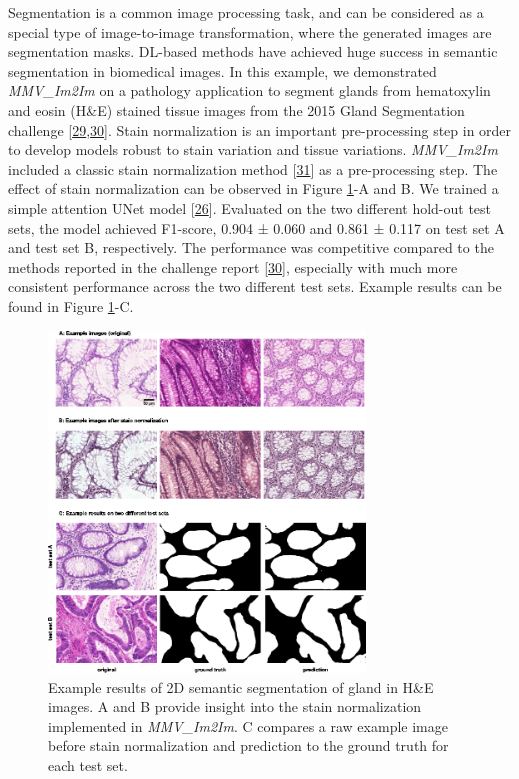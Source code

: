 Segmentation is a common image processing task, and can be considered as a special type of image-to-image transformation, where the generated images are segmentation masks. DL-based methods have achieved huge success in semantic segmentation in biomedical images. In this example, we demonstrated \emph{MMV\_Im2Im} on a pathology application to segment glands from hematoxylin and eosin (H\&E) stained tissue images from the 2015 Gland Segmentation challenge {[}\protect\hyperlink{ref-45Sirz1X}{29},\protect\hyperlink{ref-XAffSYIR}{30}{]}. Stain normalization is an important pre-processing step in order to develop models robust to stain variation and tissue variations. \emph{MMV\_Im2Im} included a classic stain normalization method {[}\protect\hyperlink{ref-tQhnZyjK}{31}{]} as a pre-processing step. The effect of stain normalization can be observed in Figure \ref{fig:2d_gland}-A and B. We trained a simple attention UNet model {[}\protect\hyperlink{ref-OCow1hly}{26}{]}. Evaluated on the two different hold-out test sets, the model achieved F1-score, 0.904 ± 0.060 and 0.861 ± 0.117 on test set A and test set B, respectively. The performance was competitive compared to the methods reported in the challenge report {[}\protect\hyperlink{ref-XAffSYIR}{30}{]}, especially with much more consistent performance across the two different test sets. Example results can be found in Figure \ref{fig:2d_gland}-C.

\begin{figure}
\hypertarget{fig:2d_gland}{%
\centering
\includegraphics[width=0.75\textwidth,height=\textheight]{images/2d_semantic_seg_justin.png}
\caption{Example results of 2D semantic segmentation of gland in H\&E images. A and B provide insight into the stain normalization implemented in \emph{MMV\_Im2Im}. C compares a raw example image before stain normalization and prediction to the ground truth for each test set.}\label{fig:2d_gland}
}
\end{figure}


